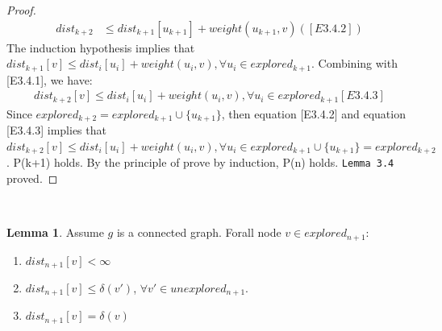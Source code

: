 \documentclass[11pt, oneside]{article}   	%
\newcommand\tab[1][1cm]{\hspace*{#1}}
\theoremstyle{definition}
\newtheorem{sublemma}{Lemma}[section]
\begin{document}
\begin{proof}
\begin{align*}
  dist_{k+2} &\leq dist_{k+1}[u_{k+1}] + weight(u_{k+1}, v)([E3.4.2])
\end{align*}
The induction hypothesis implies that $dist_{k+1}[v] \leq dist_i[u_i] + weight(u_i, v), \forall u_i \in explored_{k+1}$. Combining with [E3.4.1], we have: 
\begin{align*}
dist_{k+2}[v] \leq dist_i[u_i] + weight(u_i, v), \forall u_i \in explored_{k+1} [E3.4.3]
\end{align*}
Since $explored_{k+2} = explored_{k+1} \cup \{u_{k+1}\}$, then equation [E3.4.2] and equation [E3.4.3] implies that $dist_{k+2}[v] \leq dist_i[u_i] + weight(u_i, v), \forall u_i \in explored_{k+1} \cup \{u_{k+1}\} = explored_{k+2}$. P(k+1) holds. By the principle of prove by induction, P(n) holds. \texttt{Lemma 3.4} proved. 
\end{proof}
\tab\\


\begin{sublemma}
Assume $g$ is a connected graph. Forall node $v \in explored_{n+1}$:
\begin{enumerate}
  \item $dist_{n+1}[v] < \infty$
  \item $dist_{n+1}[v]  \leq \delta(v')$, $\forall v' \in unexplored_{n+1}$.
  \item $dist_{n+1}[v] = \delta(v)$
\end{enumerate}
\end{sublemma}
\end{document}
